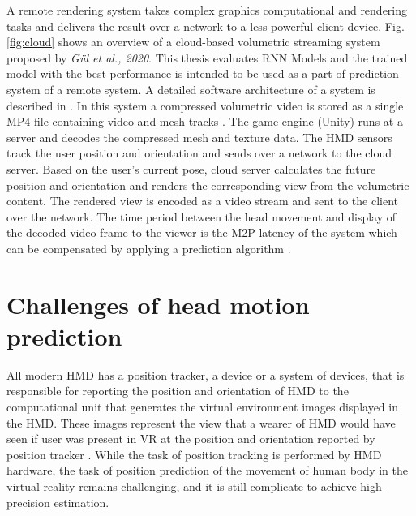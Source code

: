 A remote rendering system takes complex graphics computational and rendering tasks and delivers the result over a network to a less-powerful client device. Fig. \ref{fig:cloud} shows an overview of a cloud-based volumetric streaming system proposed by \textit{Gül et al., 2020}. This thesis evaluates RNN Models and the trained model with the best performance is intended to be used as a part of prediction system of a remote system. A detailed software architecture of a system is described in \cite{serhan_cloud_streaming}. In this system a compressed volumetric video is stored as a single MP4 file containing video and mesh tracks \cite{serhan_kalman}. The game engine (Unity) runs at a server and decodes the compressed mesh and texture data. The HMD sensors track the user position and orientation and sends over a network to the cloud server. Based on the user's current pose, cloud server calculates the future position and orientation and renders the corresponding view from the volumetric content. The rendered view is encoded as a video stream and sent to the client over the network. The time period between the head movement and display of the decoded video frame to the viewer is the M2P latency of the system which can be compensated by applying a prediction algorithm \cite{serhan_kalman}.

\newpage
\section{Challenges of head motion prediction}
\label{sec:theorie:head_pred}
All modern HMD has a position tracker, a device or a system of devices, that is responsible for reporting the position and orientation of HMD to the computational unit that generates the virtual environment images displayed in the HMD. These images represent the view that a wearer of HMD would have seen if user was present in VR at the position and orientation reported by position tracker \cite{hmd}. While the task of position tracking is performed by HMD hardware, the task of position prediction of the movement of human body in the virtual reality remains challenging, and it is still complicate to achieve high-precision estimation.

